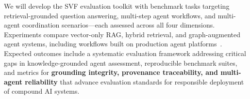 \documentclass[conference, 10pt]{IEEEtran}
\begin{document}
We will develop the SVF evaluation toolkit with benchmark tasks targeting retrieval-grounded question answering, multi-step agent workflows, and multi-agent coordination scenarios---each assessed across all four dimensions. Experiments compare vector-only RAG, hybrid retrieval, and graph-augmented~\cite{Edge2024GraphRAG} agent systems, including workflows built on production agent platforms~\cite{AWSBedrockHybridSearch2024}. Expected outcomes include a systematic evaluation framework addressing critical gaps in knowledge-grounded agent assessment, reproducible benchmark suites, and metrics for \textbf{grounding integrity, provenance traceability, and multi-agent reliability} that advance evaluation standards for responsible deployment of compound AI systems.



\end{document}
